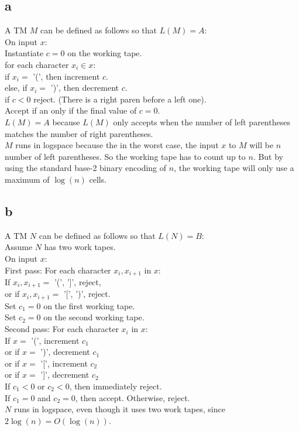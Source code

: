 \documentclass[letterpaper,notitlepage,twoside]{article}
\newcommand\tab[1][1cm]{\hspace*{#1}} %
\begin{document}
\subsection*{a}
A TM $M$ can be defined as follows so that $L(M) = A$: \\
On input $x$: \\
\tab Instantiate $c = 0$ on the working tape. \\
\tab for each character $x_i \in x$: \\
\tab\tab if $x_i =$ '(', then increment $c$. \\
\tab\tab else, if $x_i =$ ')', then decrement $c$. \\
\tab\tab if $c < 0$ reject. (There is a right paren before a left one). \\
\tab Accept if an only if the final value of $c = 0$. \\
$L(M) = A$ because $L(M)$ only accepts when the number of left parentheses matches the number of right parentheses. \\
$M$ runs in logspace because the in the worst case, the input $x$ to $M$ will be $n$ number of left parentheses. So the working tape has to count up to $n$. But by using the standard base-2 binary encoding of $n$, the working tape will only use a maximum of $\log(n)$ cells. \\

\subsection*{b}
A TM $N$ can be defined as follows so that $L(N) = B$: \\
Assume $N$ has two work tapes. \\
On input $x$: \\
\tab First pass: For each character $x_i, x_{i + 1}$ in $x$: \\
\tab\tab If $x_i, x_{i + 1} = $ '(', ']', reject, \\
\tab\tab or if $x_i, x_{i + 1} = $ '[', ')', reject. \\

Set $c_1 = 0$ on the first working tape. \\
Set $c_2 = 0$ on the second working tape. \\
\tab Second pass: For each character $x_i$ in $x$: \\
\tab\tab If $x = $ '(', increment $c_1$ \\
\tab\tab or if $x = $ ')', decrement $c_1$ \\
\tab\tab or if $x = $ '[', increment $c_2$ \\ 
\tab\tab or if $x = $ ']', decrement $c_2$ \\
\tab\tab If $c_1 < 0$ or $c_2 < 0$, then immediately reject. \\
\tab If $c_1 = 0$ and $c_2 = 0$, then accept. Otherwise, reject. \\

$N$ runs in logspace, even though it uses two work tapes, since $2\log(n) = O(\log(n))$.
\end{document}
